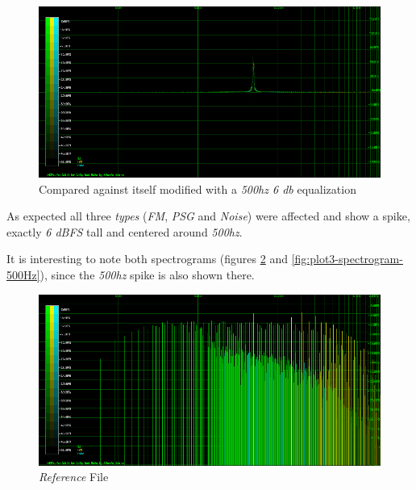 \documentclass[10pt,a4paper]{report}
\begin{document}
\begin{figure}[H]
	\centering
	\includegraphics[width=1.0\linewidth]{images/interpretation/Plot3-Modified.png}
	\caption[1kHz modified]{Compared against itself modified with a \textit{500hz 6 db} equalization}
	\label{fig:plot3-modified}
\end{figure}

As expected all three \textit{types} (\textit{FM}, \textit{PSG} and \textit{Noise}) were affected and show a spike, exactly \textit{6 dBFS} tall and centered around \textit{500hz}.

It is interesting to note both spectrograms (figures \ref{fig:plot3-spectrogram} and \ref{fig:plot3-spectrogram-500Hz}), since the \textit{500hz} spike is also shown there.

\begin{figure}[H]
	\centering
	\includegraphics[width=1.0\linewidth]{images/interpretation/Plot3-Spectrogram.png}
	\caption[Reference File]{\textit{Reference} File}
	\label{fig:plot3-spectrogram}
\end{figure}
\end{document}
